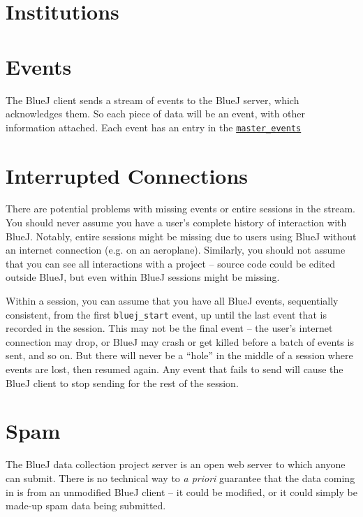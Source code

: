 \documentclass{book}
\begin{document}
\section{Institutions}
\label{def:institution_id}

\section{Events}

The BlueJ client sends a stream of events to the BlueJ server, which
acknowledges them.  So each piece of data will be an event, with other
information attached.  Each event has an entry in the \hyperref[tab:master_events]{\texttt{master\_events}}

\section{Interrupted Connections}
\label{def:interruption}

There are potential problems with missing events or entire sessions in the stream.  You should
never assume you have a user's complete history of interaction with BlueJ.
Notably, entire sessions might be missing due to users using BlueJ without an
internet connection (e.g. on an aeroplane).  Similarly, you should not assume
that you can see all interactions with a project -- source code could be
edited outside BlueJ, but even within BlueJ sessions might be missing.

Within a session, you can assume that you have all BlueJ events, sequentially
consistent, from the first \texttt{bluej\_start} event, up until the last
event that is recorded in the session.  This may not be the final event -- the user's
internet connection may drop, or BlueJ may crash or get killed before a batch of events
is sent, and so on.  But there will never be a ``hole'' in the middle of a
session where events are lost, then resumed again.  Any event that fails to
send will cause the BlueJ client to stop sending for the rest of the session.

\section{Spam}
\label{def:spam}

The BlueJ data collection project server is an open web server to which anyone
can submit.  There is no technical way to \textit{a priori} guarantee that the
data coming in is from an unmodified BlueJ client -- it could be modified, or
it could simply be made-up spam data being submitted.
\end{document}

